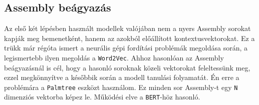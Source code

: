 \subsection{Assembly beágyazás}
Az első két lépésben használt modellek valójában nem a nyers Assembly sorokat
kapják meg bemenetként, hanem az azokból előállított kontextusvektorokat. Ez
a trükk már régóta ismert a neurális gépi fordítási problémák megoldása során,
a legismertebb ilyen megoldás a \texttt{Word2Vec}\cite{word2vec}. Ahhoz hasonlóan az
Assembly beágyazásnál is cél, hogy a hasonló soroknak közeli vektorokat
feleltessünk meg, ezzel megkönnyítve a későbbik során a modell tanulási
folyamatát. Én erre a problémára a \texttt{Palmtree}\cite{palmtree} eszközt használom. Ez
minden sor Assembly-t egy \texttt{N} dimenziós vektorba képez le. Működési elve
a \texttt{BERT}\cite{bert}-höz hasonló.
